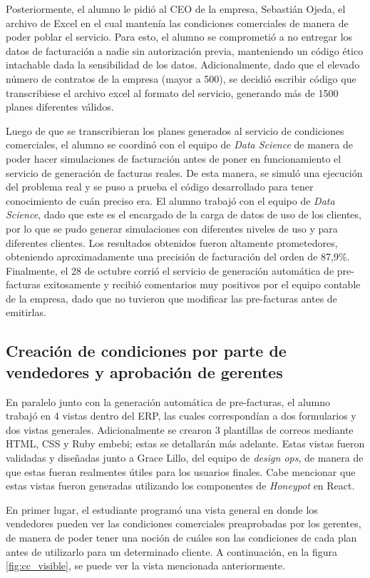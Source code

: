     Posteriormente, el alumno le pidió al CEO de la empresa, Sebastián Ojeda, el archivo de Excel en el cual mantenía las condiciones comerciales de manera de poder poblar el servicio. Para esto, el alumno se comprometió a no entregar los datos de facturación a nadie sin autorización previa, manteniendo un código ético intachable dada la sensibilidad de los datos. Adicionalmente, dado que el elevado número de contratos de la empresa (mayor a 500), se decidió escribir código que transcribiese el archivo excel al formato del servicio, generando más de 1500 planes diferentes válidos.

    Luego de que se transcribieran los planes generados al servicio de condiciones comerciales, el alumno se coordinó con el equipo de \textit{Data Science} de manera de poder hacer simulaciones de facturación antes de poner en funcionamiento el servicio de generación de facturas reales. De esta manera, se simuló una ejecución del problema real y se puso a prueba el código desarrollado para tener conocimiento de cuán preciso era. El alumno trabajó con el equipo de \textit{Data Science}, dado que este es el encargado de la carga de datos de uso de los clientes, por lo que se pudo generar simulaciones con diferentes niveles de uso y para diferentes clientes. Los resultados obtenidos fueron altamente prometedores, obteniendo aproximadamente una precisión de facturación del orden de 87,9\%. Finalmente, el 28 de octubre corrió el servicio de generación automática de pre-facturas exitosamente y recibió comentarios muy positivos por el equipo contable de la empresa, dado que no tuvieron que modificar las pre-facturas antes de emitirlas.

  \subsection{Creación de condiciones por parte de vendedores y aprobación de gerentes}
    En paralelo junto con la generación automática de pre-facturas, el alumno trabajó en 4 vistas dentro del ERP, las cuales correspondían a dos formularios y dos vistas generales. Adicionalmente se crearon 3 plantillas de correos mediante HTML, CSS y Ruby embebi; estas se detallarán más adelante. Estas vistas fueron validadas y diseñadas junto a Grace Lillo, del equipo de \textit{design ops}, de manera de que estas fueran realmentes útiles para los usuarios finales. Cabe mencionar que estas vistas fueron generadas utilizando los componentes de \textit{Honeypot} en React. 
    
    En primer lugar, el estudiante programó una vista general en donde los vendedores pueden ver las condiciones comerciales preaprobadas por los gerentes, de manera de poder tener una noción de cuáles son las condiciones de cada plan antes de utilizarlo para un determinado cliente. A continuación, en la figura \ref{fig:cc_visible}, se puede ver la vista mencionada anteriormente.


